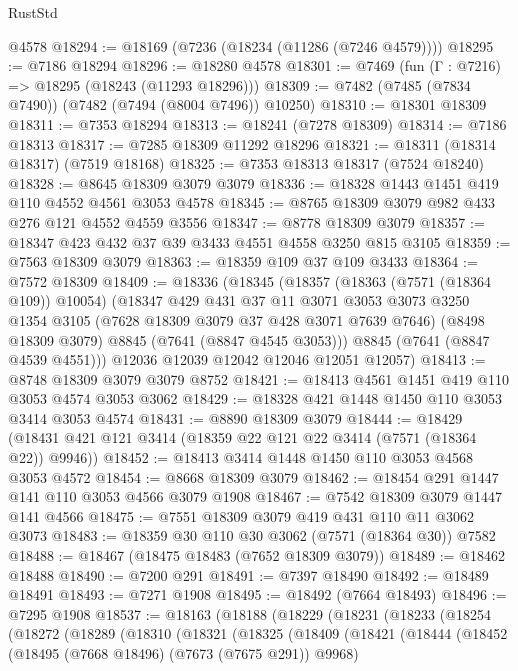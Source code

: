 \begin{lexlean}{RustStd}
\begin{coremodule}
{\begin{coremodule}
{{{{{{{{{{{{{{{{{{{{{{{{{{{{{{{{    @4578
@18294 := @18169 (@7236 (@18234 (@11286 (@7246 @4579))))
@18295 := @7186 @18294
@18296 := @18280 @4578
@18301 := @7469 (fun (Γ : @7216) => @18295 (@18243 (@11293 @18296)))
@18309 := @7482 (@7485 (@7834 @7490)) (@7482 (@7494 (@8004 @7496)) @10250)
@18310 := @18301 @18309
@18311 := @7353 @18294
@18313 := @18241 (@7278 @18309)
@18314 := @7186 @18313
@18317 := @7285 @18309 @11292 @18296
@18321 := @18311 (@18314 @18317) (@7519 @18168)
@18325 := @7353 @18313 @18317 (@7524 @18240)
@18328 := @8645 @18309 @3079 @3079
@18336 := @18328 @1443 @1451 @419 @110 @4552 @4561 @3053 @4578
@18345 := @8765 @18309 @3079 @982 @433 @276 @121 @4552 @4559 @3556
@18347 := @8778 @18309 @3079
@18357 := @18347 @423 @432 @37 @39 @3433 @4551 @4558 @3250 @815 @3105
@18359 := @7563 @18309 @3079
@18363 := @18359 @109 @37 @109 @3433
@18364 := @7572 @18309
@18409 := @18336
    (@18345
      (@18357
        (@18363 (@7571 (@18364 @109)) @10054)
        (@18347
          @429
          @431
          @37
          @11
          @3071
          @3053
          @3073
          @3250
          @1354
          @3105
          (@7628 @18309 @3079 @37 @428 @3071 @7639 @7646)
          (@8498 @18309 @3079)
          @8845
          (@7641 (@8847 @4545 @3053)))
        @8845
        (@7641 (@8847 @4539 @4551)))
      @12036
      @12039
      @12042
      @12046
      @12051
      @12057)
@18413 := @8748 @18309 @3079 @3079 @8752
@18421 := @18413 @4561 @1451 @419 @110 @3053 @4574 @3053 @3062
@18429 := @18328 @421 @1448 @1450 @110 @3053 @3414 @3053 @4574
@18431 := @8890 @18309 @3079
@18444 := @18429 (@18431 @421 @121 @3414 (@18359 @22 @121 @22 @3414 (@7571 (@18364 @22)) @9946))
@18452 := @18413 @3414 @1448 @1450 @110 @3053 @4568 @3053 @4572
@18454 := @8668 @18309 @3079
@18462 := @18454 @291 @1447 @141 @110 @3053 @4566 @3079 @1908
@18467 := @7542 @18309 @3079 @1447 @141 @4566
@18475 := @7551 @18309 @3079 @419 @431 @110 @11 @3062 @3073
@18483 := @18359 @30 @110 @30 @3062 (@7571 (@18364 @30)) @7582
@18488 := @18467 (@18475 @18483 (@7652 @18309 @3079))
@18489 := @18462 @18488
@18490 := @7200 @291
@18491 := @7397 @18490
@18492 := @18489 @18491
@18493 := @7271 @1908
@18495 := @18492 (@7664 @18493)
@18496 := @7295 @1908
@18537 := @18163
    (@18188
      (@18229
        (@18231
          (@18233
            (@18254
              (@18272
                (@18289
                  (@18310
                    (@18321
                      (@18325
                        (@18409
                          (@18421
                            (@18444
                              (@18452
                                (@18495 (@7668 @18496) (@7673 (@7675 @291)) @9968)
}}}}}}}}}}}}}}}}}}}}}}}}}}}}}}}}
\end{coremodule}}
\end{coremodule}
\end{lexlean}
